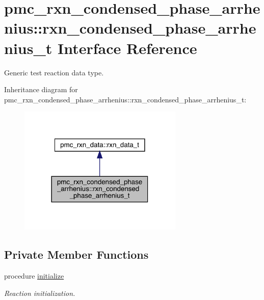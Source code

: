\hypertarget{structpmc__rxn__condensed__phase__arrhenius_1_1rxn__condensed__phase__arrhenius__t}{}\section{pmc\+\_\+rxn\+\_\+condensed\+\_\+phase\+\_\+arrhenius\+:\+:rxn\+\_\+condensed\+\_\+phase\+\_\+arrhenius\+\_\+t Interface Reference}
\label{structpmc__rxn__condensed__phase__arrhenius_1_1rxn__condensed__phase__arrhenius__t}


Generic test reaction data type.  




Inheritance diagram for pmc\+\_\+rxn\+\_\+condensed\+\_\+phase\+\_\+arrhenius\+:\+:rxn\+\_\+condensed\+\_\+phase\+\_\+arrhenius\+\_\+t\+:\nopagebreak
\begin{figure}[H]
\begin{center}
\leavevmode
\includegraphics[width=222pt]{structpmc__rxn__condensed__phase__arrhenius_1_1rxn__condensed__phase__arrhenius__t__inherit__graph}
\end{center}
\end{figure}
\subsection*{Private Member Functions}
\begin{DoxyCompactItemize}
\item 
procedure \mbox{\hyperlink{structpmc__rxn__condensed__phase__arrhenius_1_1rxn__condensed__phase__arrhenius__t_aa8ad8be81fae8483f8ca9cd8697fef30}{initialize}}
\begin{DoxyCompactList}\small\item\em Reaction initialization. \end{DoxyCompactList}\end{DoxyCompactItemize}
